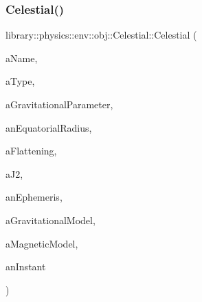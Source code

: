\subsubsection{\texorpdfstring{Celestial()}{Celestial()}\hspace{0.1cm}{\footnotesize\ttfamily [1/2]}}
{\footnotesize\ttfamily library\+::physics\+::env\+::obj\+::\+Celestial\+::\+Celestial (\begin{DoxyParamCaption}\item[{const String \&}]{a\+Name,  }\item[{const \hyperlink{classlibrary_1_1physics_1_1env_1_1obj_1_1_celestial_aab1f58aa727e639288d65f3d33c4f245}{Celestial\+::\+Type} \&}]{a\+Type,  }\item[{const \hyperlink{classlibrary_1_1physics_1_1units_1_1_derived}{Derived} \&}]{a\+Gravitational\+Parameter,  }\item[{const \hyperlink{classlibrary_1_1physics_1_1units_1_1_length}{Length} \&}]{an\+Equatorial\+Radius,  }\item[{const Real \&}]{a\+Flattening,  }\item[{const Real \&}]{a\+J2,  }\item[{const Shared$<$ \hyperlink{classlibrary_1_1physics_1_1env_1_1_ephemeris}{Ephemeris} $>$ \&}]{an\+Ephemeris,  }\item[{const Shared$<$ \hyperlink{namespacelibrary_1_1physics_1_1env_1_1obj_ade509c84a4970a3420c03c058ada152a}{Gravitational\+Model} $>$ \&}]{a\+Gravitational\+Model,  }\item[{const Shared$<$ \hyperlink{namespacelibrary_1_1physics_1_1env_1_1obj_a86d4e595a77f8bd5ed03ecd32c3a80de}{Magnetic\+Model} $>$ \&}]{a\+Magnetic\+Model,  }\item[{const \hyperlink{classlibrary_1_1physics_1_1time_1_1_instant}{Instant} \&}]{an\+Instant }\end{DoxyParamCaption})}

\mbox{\label{classlibrary_1_1physics_1_1env_1_1obj_1_1_celestial_a42ae8e153f9c3c567e2b4bf9606cf9c4}} 
